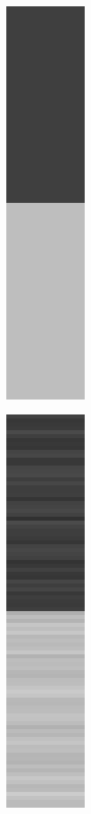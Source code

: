 \documentclass[onecolumn,final,a4paper,13pt,reqno]{siamart}
\begin{document}
\begin{figure}[t]
	\centering
	\begin{subfigure}[t]{0.08\textwidth}
		\includegraphics[scale=0.3]{pictures/denoising/signal/signal.png}
	\end{subfigure}
	\begin{subfigure}[t]{0.08\textwidth}
		\includegraphics[scale=0.3]{pictures/denoising/signal/perturbed_signal.png}

\end{subfigure}
\end{figure}
\end{document}
